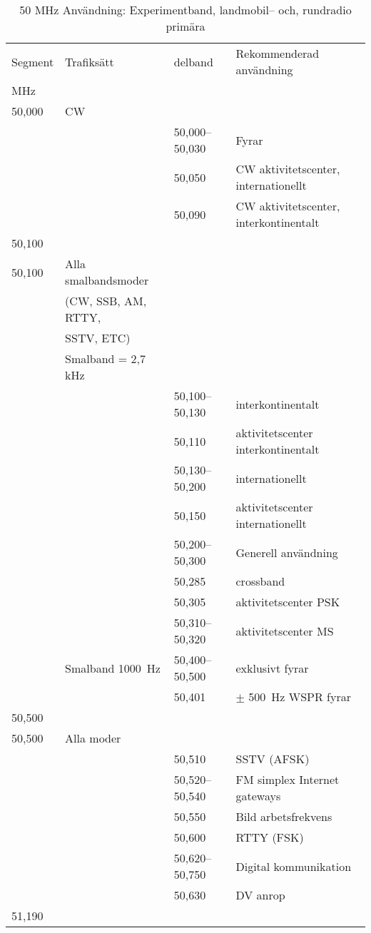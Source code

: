 \setlongtables
\begin{longtable}{llll}
\caption{50 MHz Användning: Experimentband, landmobil-- och, rundradio primära}\\
Segment & Trafiksätt & delband & Rekommenderad användning \\
MHz     &            &         & \\ \hline
\endhead
50,000 & CW &                 & \\
       &    & 50,000--50,030 & Fyrar\\
       &    & 50,050          & CW aktivitetscenter, internationellt\\
       &    & 50,090          & CW aktivitetscenter, interkontinentalt\\
50,100 &    &                 & \\ \hline

50,100 & Alla smalbandsmoder & &\\
       & (CW, SSB, AM, RTTY, & &\\
       & SSTV, ETC)          & &\\
       & Smalband = 2,7 kHz  & &\\
       & & 50,100--50,130 & interkontinentalt\\
       & & 50,110 & aktivitetscenter interkontinentalt\\
       & & 50,130--50,200 & internationellt\\
       & & 50,150 & aktivitetscenter internationellt\\
       & & 50,200--50,300 & Generell användning\\
       & & 50,285 & crossband\\
       & & 50,305 & aktivitetscenter PSK\\
       & & 50,310--50,320 & aktivitetscenter MS\\
       & Smalband 1000~Hz & 50,400--50,500 & exklusivt fyrar\\
       & & 50,401 & \(\pm\) 500~Hz WSPR fyrar\\
50,500 &    &                 & \\ \hline

50,500 & Alla moder & & \\
       & & 50,510 & SSTV (AFSK)\\
       & & 50,520--50,540 & FM simplex Internet gateways\\
       & & 50,550 & Bild arbetsfrekvens\\
       & & 50,600 & RTTY (FSK)\\
       & & 50,620--50,750 & Digital kommunikation\\
       & & 50,630 & DV anrop\\
51,190 &    &   & \\ \hline


\end{longtable}
